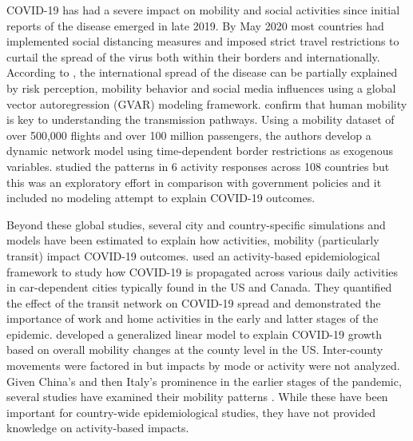 \documentclass[preprint, 12pt]{elsarticle}
\newcommand{\?}{\stackrel{?}{=}}
\begin{document}
COVID-19 has had a severe impact on mobility and social activities since initial reports of the disease emerged in late 2019.
By May 2020 most countries had implemented social distancing measures and imposed strict travel restrictions to curtail the spread of the virus
both within their borders and internationally.
According to \cite{bonaccorsi2020economic}, the international spread of the disease can be partially explained by risk perception,
mobility behavior and social media influences using a global vector autoregression (GVAR) modeling framework\cite{dees2007exploring}.
\cite{zhang2020pathways} confirm that human mobility is key to understanding the transmission pathways.
Using a mobility dataset of over 500,000 flights and over 100 million passengers,
the authors develop a dynamic network model using time-dependent border restrictions as exogenous variables.
\cite{mckenzie2020country} studied the patterns in 6 activity responses across 108 countries but this was an exploratory effort in comparison with government policies and it included no modeling attempt to explain COVID-19 outcomes.

Beyond these global studies, several city and country-specific simulations and models have been estimated to explain how activities, mobility (particularly transit) impact COVID-19 outcomes.
\cite{kumar2020activitybaseda} used an activity-based epidemiological framework to study how COVID-19 is propagated across various daily activities in car-dependent cities typically found in the US and Canada.
They quantified the effect of the transit network on COVID-19 spread and demonstrated the importance of work and home activities in the early and latter stages of the epidemic.
\cite{badr2020association} developed a generalized linear model to explain COVID-19 growth based on overall mobility changes at the county level in the US. Inter-county movements were factored in but impacts by mode or activity were not analyzed.
Given China's and then  Italy's prominence in the earlier stages of the pandemic, several studies have examined their mobility patterns \cite{
  kraemer2020effect,bonaccorsi2020economic,pepe2020covid19,carteni2020how}.
While these have been important for country-wide epidemiological studies, they have not provided knowledge on activity-based impacts.
\end{document}
